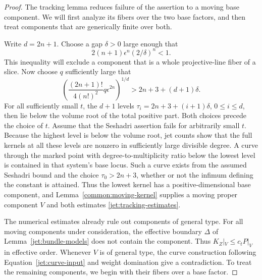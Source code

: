 \begin{proof}
The tracking lemma reduces failure of the assertion to a moving base
component.  We will first analyze its fibers over the two base factors,
and then treat components that are generically finite over both.

Write \(d=2n+1\). Choose a gap \(\delta>0\) large enough that
\[
 2(n+1)\epsilon^n(2/\delta)^n<1.
\]
This inequality will exclude a component that is a whole projective-line
fiber of a slice. Now choose \(q\) sufficiently large that
\[
 \left(\frac{(2n+1)!}{4(n!)^2}q\epsilon^{2n}\right)^{1/d}
 >2n+3+(d+1)\delta.
\]
For all sufficiently small \(t\), the \(d+1\) levels
\(\tau_i=2n+3+(i+1)\delta\), \(0\le i\le d\), then lie below
the volume root of the total positive part. Both choices precede
the choice of \(t\).
Assume that the Seshadri assertion fails for arbitrarily small \(t\).
Because the highest level is below the volume root, jet counts show
that the full kernels at all these levels are nonzero in sufficiently
large divisible degree. A curve through the marked
point with degree-to-multiplicity ratio below the lowest level is
contained in that system's base locus.  Such a curve exists from
the assumed Seshadri bound and the choice \(\tau_0>2n+3\), whether or
not the infimum defining the constant is attained. Thus the lowest
kernel has a positive-dimensional base component, and
Lemma~\ref{common:moving-kernel} supplies a
moving proper component \(V\) and both estimates
\eqref{jet:tracking-estimates}.

The numerical estimates already rule out components of general type.
For all moving components under consideration, the effective
boundary \(\Delta\) of Lemma~\ref{jet:bundle-models} does not contain
the component.  Thus \(K_Z|_V\le c_tP|_V\) in effective order.
Whenever \(V\) is of general type, the curve construction following
Equation~\eqref{jet:curve-input} and weight domination give a
contradiction.  To treat the remaining components, we begin with
their fibers over a base factor.


\end{proof}
